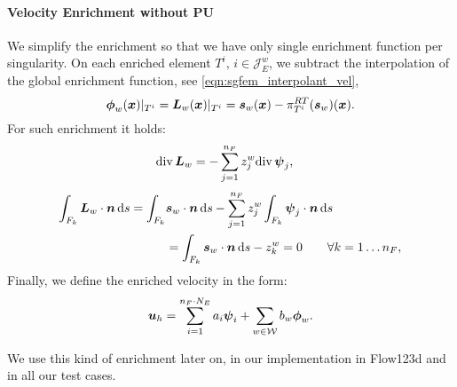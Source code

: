 \paragraph{Velocity Enrichment without PU}
We simplify the enrichment so that we have only single enrichment function per singularity.
On each enriched element $T^i,\, i\in\mathcal{J}^w_E$, we subtract the interpolation
of the global enrichment function, see \eqref{eqn:sgfem_interpolant_vel},
\begin{equation}
    \mathbf{\boldsymbol{\phi}}_w(\mathbf{\boldsymbol{x}})|_{T^i} = \mathbf{\boldsymbol{L}}_{w}(\mathbf{\boldsymbol{x}})|_{T^i} = \mathbf{\boldsymbol{s}}_w(\mathbf{\boldsymbol{x}}) - \pi^{RT}_{T^i}(\mathbf{\boldsymbol{s}}_w)(\mathbf{\boldsymbol{x}}).
    \label{eqn:local_enr_vel}
\end{equation}
%
For such enrichment it holds:   
\begin{align}
    {\rm div}\,\mathbf{\boldsymbol{L}}_w &= - \sum \limits_{j=1}^{n_F} z^w_j {\rm div}\,\mathbf{\boldsymbol{\psi}}_j,
    \label{eqn:local_enr_vel_div_single}
\end{align}
\begin{align}
    \int_{F_k} \mathbf{\boldsymbol{L}}_w\cdot\mathbf{\boldsymbol{n}} \,{\rm d} s = \int_{F_k} &\mathbf{\boldsymbol{s}}_w\cdot\mathbf{\boldsymbol{n}} \,{\rm d} s
        - \sum \limits_{j=1}^{n_F} z^w_j \int_{F_k} \mathbf{\boldsymbol{\psi}}_j \cdot \mathbf{\boldsymbol{n}} \,{\rm d} s \nonumber\\
    &= \int_{F_k} \mathbf{\boldsymbol{s}}_w\cdot\mathbf{\boldsymbol{n}} \,{\rm d} s - z^w_k = 0 \qquad \forall k=1\ldots n_F
    \label{eqn:local_enr_vel_normal},
\end{align}
%
Finally, we define the enriched velocity in the form:
\begin{equation}
    \mathbf{\boldsymbol{u}}_h = 
    \sum \limits_{i=1}^{n_F\cdot N_E} a_i \mathbf{\boldsymbol{\psi}}_i + 
    \sum \limits_{w\in\mathcal{W}} b_w \mathbf{\boldsymbol{\phi}}_w.
    \label{eqn:velocity_enriched_approximation}
\end{equation}

We use this kind of enrichment later on, in our implementation in Flow123d and in all our test cases.


